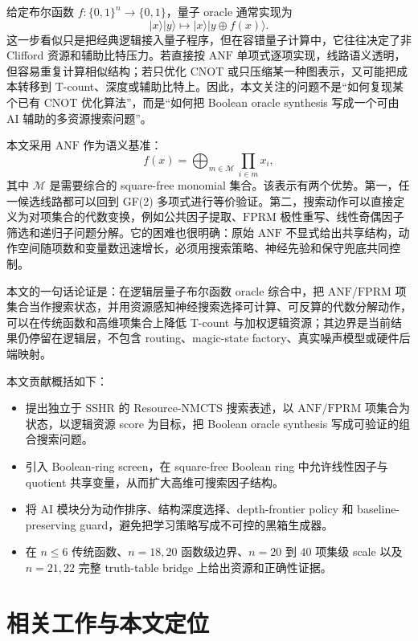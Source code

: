 \documentclass[UTF8,fontset=macnew,11pt]{ctexart}
\newcommand{\method}{Resource-NMCTS}
\newcommand{\screen}{Boolean-ring screen}
\newcommand{\anf}{\ensuremath{\mathrm{ANF}}}
\newcommand{\fprm}{\ensuremath{\mathrm{FPRM}}}
\newcommand{\xor}{\ensuremath{\oplus}}
\newcommand{\ttable}{truth-table}
\begin{document}
给定布尔函数 $f:\{0,1\}^n\rightarrow\{0,1\}$，量子 oracle 通常实现为
\begin{equation}
  |x\rangle |y\rangle \mapsto |x\rangle |y\xor f(x)\rangle .
  \label{eq:oracle}
\end{equation}
这一步看似只是把经典逻辑接入量子程序，但在容错量子计算中，它往往决定了非 Clifford 资源和辅助比特压力。若直接按 \anf{} 单项式逐项实现，线路语义透明，但容易重复计算相似结构；若只优化 CNOT 或只压缩某一种图表示，又可能把成本转移到 T-count、深度或辅助比特上。因此，本文关注的问题不是“如何复现某个已有 CNOT 优化算法”，而是“如何把 Boolean oracle synthesis 写成一个可由 AI 辅助的多资源搜索问题”。

本文采用 \anf{} 作为语义基准：
\begin{equation}
  f(x)=\bigoplus_{m\in\mathcal{M}}\prod_{i\in m}x_i ,
  \label{eq:anf}
\end{equation}
其中 $\mathcal{M}$ 是需要综合的 square-free monomial 集合。该表示有两个优势。第一，任一候选线路都可以回到 GF(2) 多项式进行等价验证。第二，搜索动作可以直接定义为对项集合的代数变换，例如公共因子提取、\fprm{} 极性重写、线性奇偶因子筛选和递归子问题分解。它的困难也很明确：原始 \anf{} 不显式给出共享结构，动作空间随项数和变量数迅速增长，必须用搜索策略、神经先验和保守兜底共同控制。

本文的一句话论证是：在逻辑层量子布尔函数 oracle 综合中，把 \anf{}/\fprm{} 项集合当作搜索状态，并用资源感知神经搜索选择可计算、可反算的代数分解动作，可以在传统函数和高维项集合上降低 T-count 与加权逻辑资源；其边界是当前结果仍停留在逻辑层，不包含 routing、magic-state factory、真实噪声模型或硬件后端映射。

本文贡献概括如下：
\begin{itemize}
  \item 提出独立于 SSHR 的 \method{} 搜索表述，以 \anf{}/\fprm{} 项集合为状态，以逻辑资源 score 为目标，把 Boolean oracle synthesis 写成可验证的组合搜索问题。
  \item 引入 \screen{}，在 square-free Boolean ring 中允许线性因子与 quotient 共享变量，从而扩大高维可搜索因子结构。
  \item 将 AI 模块分为动作排序、结构深度选择、depth-frontier policy 和 baseline-preserving guard，避免把学习策略写成不可控的黑箱生成器。
  \item 在 $n\leq6$ 传统函数、$n=18,20$ 函数级边界、$n=20$ 到 $40$ 项集级 scale 以及 $n=21,22$ 完整 \ttable{} bridge 上给出资源和正确性证据。
\end{itemize}

\section{相关工作与本文定位}
\end{document}
